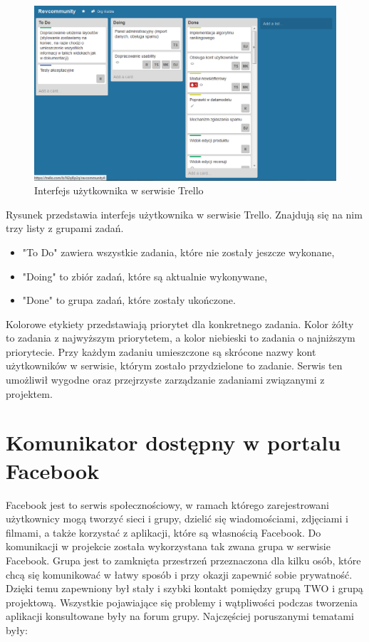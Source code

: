 \begin{figure}[h]
	\centering
	\includegraphics[width=1.00\textwidth]{images/trello.png}
	\caption{Interfejs użytkownika w serwisie Trello}
\end{figure}


Rysunek przedstawia interfejs użytkownika w serwisie Trello. Znajdują się na nim trzy listy z grupami zadań.

\begin{itemize}
\item "To Do" zawiera wszystkie zadania, które nie zostały jeszcze wykonane,
\item "Doing" to zbiór zadań, które są aktualnie wykonywane,
\item "Done" to grupa zadań, które zostały ukończone.
\end{itemize}


Kolorowe etykiety przedstawiają priorytet dla konkretnego zadania. Kolor żółty to zadania z najwyższym priorytetem, a kolor niebieski to zadania o najniższym priorytecie. Przy każdym zadaniu umieszczone są skrócone nazwy kont użytkowników w serwisie, którym zostało przydzielone to zadanie. 
Serwis ten umożliwił wygodne oraz przejrzyste zarządzanie zadaniami związanymi z projektem.

\section{Komunikator dostępny w portalu Facebook}
Facebook jest to serwis społecznościowy, w ramach którego zarejestrowani użytkownicy mogą tworzyć sieci i grupy, dzielić się wiadomościami, zdjęciami i filmami, a także korzystać z aplikacji, które są własnością Facebook. Do komunikacji w projekcie została wykorzystana tak zwana grupa w serwisie Facebook. Grupa  jest to zamknięta przestrzeń przeznaczona dla kilku osób, które chcą się komunikować w łatwy sposób i przy okazji zapewnić sobie prywatność. Dzięki temu zapewniony był stały i szybki kontakt pomiędzy grupą TWO i grupą projektową. Wszystkie pojawiające się problemy i wątpliwości podczas tworzenia aplikacji konsultowane były na forum grupy. Najczęściej poruszanymi tematami były:

